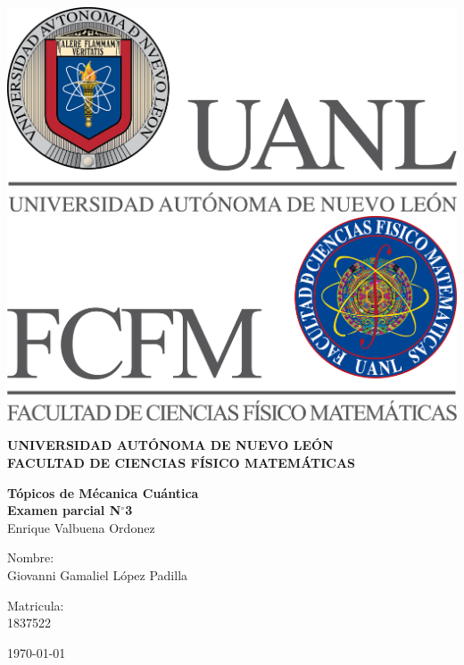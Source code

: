 \begin{titlepage}
    \begin{center}
    \includegraphics[scale=0.40]{../../Logos/uanl.png} 
    \hspace{2.5cm}
    \includegraphics[scale=0.40]{../../Logos/fcfm.png}
    \end{center}
    \vspace{2cm}
    \begin{center}
    \textbf{
    UNIVERSIDAD AUTÓNOMA DE NUEVO LEÓN\\
    FACULTAD DE CIENCIAS
        FÍSICO MATEMÁTICAS}\\
    \vspace*{2cm}
    \begin{large}
    \vspace{1cm}
    \large{\textbf{Tópicos de Mécanica Cuántica}}\\
    \textbf{Examen parcial  N$^{\circ}$3}\\
    Enrique Valbuena Ordonez\\
    \end{large}
    \vspace{3.5cm}
    \begin{minipage}{0.6\linewidth}
    \vspace{0.5cm}
    \changefontsizes{14pt}
    Nombre:\\
    Giovanni Gamaliel López Padilla\\
    \end{minipage}
    \begin{minipage}{0.2\linewidth}
    \changefontsizes{14pt}
    Matricula:\\
    1837522
    \end{minipage}
    \end{center}
    \vspace{4cm}
    \begin{flushright}
    \today
    \end{flushright}
    \end{titlepage}